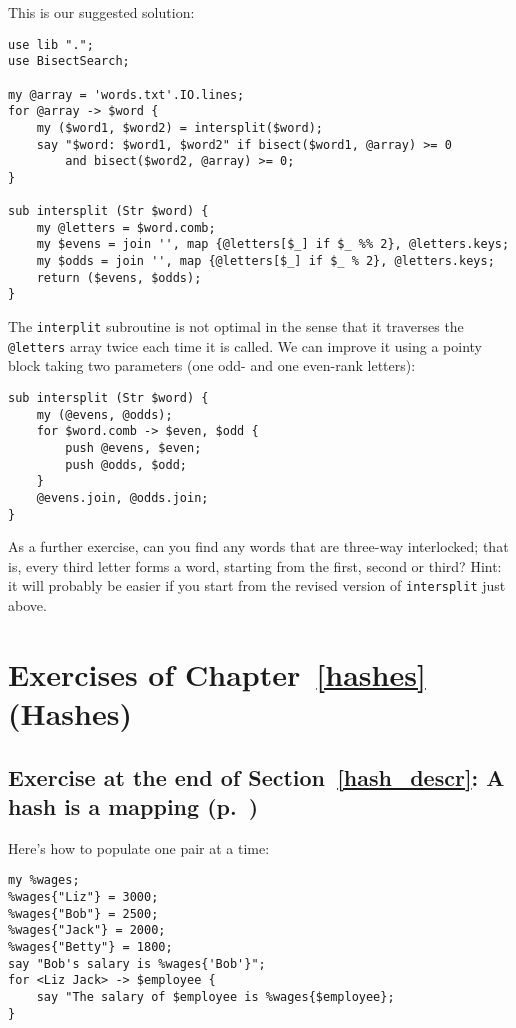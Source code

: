 This is our suggested solution:
\begin{verbatim}
use lib ".";
use BisectSearch;

my @array = 'words.txt'.IO.lines;
for @array -> $word {
    my ($word1, $word2) = intersplit($word);
    say "$word: $word1, $word2" if bisect($word1, @array) >= 0 
        and bisect($word2, @array) >= 0;
}

sub intersplit (Str $word) {
    my @letters = $word.comb;
    my $evens = join '', map {@letters[$_] if $_ %% 2}, @letters.keys;
    my $odds = join '', map {@letters[$_] if $_ % 2}, @letters.keys;
    return ($evens, $odds);
}
\end{verbatim}

The {\tt interplit} subroutine is not optimal in the 
sense that it traverses the \verb'@letters' array twice 
each time it is called. We can improve it using a pointy 
block taking two parameters (one odd- and one even-rank 
letters):
\begin{verbatim}
sub intersplit (Str $word) {
    my (@evens, @odds);
    for $word.comb -> $even, $odd {
        push @evens, $even;
        push @odds, $odd;
    }
    @evens.join, @odds.join;
}
\end{verbatim}

As a further exercise, can you find any words that are 
three-way interlocked; that is, every third letter forms a 
word, starting from the first, second or third? Hint: it 
will probably be easier if you start from the revised 
version of {\tt intersplit} just above.

\section{Exercises of Chapter~\ref{hashes} (Hashes)}

\subsection{Exercise at the end of Section~\ref{hash_descr}: A hash is a mapping (p.~\pageref{ex_employees})}
\label{sol_ex_employees}

Here's how to populate one pair at a time:

\begin{verbatim}
my %wages;
%wages{"Liz"} = 3000;
%wages{"Bob"} = 2500;
%wages{"Jack"} = 2000;
%wages{"Betty"} = 1800;
say "Bob's salary is %wages{'Bob'}";
for <Liz Jack> -> $employee {
    say "The salary of $employee is %wages{$employee};
}
\end{verbatim}


